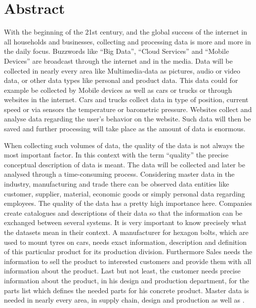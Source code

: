 \chapter*{Abstract}


With the beginning of the 21st century, and the global success of the internet in all households and businesses, collecting and processing data is more and more in the daily focus. Buzzwords like \enquote{Big Data}, \enquote{Cloud Services} and \enquote{Mobile Devices} are broadcast through the internet and in the media. Data will be collected in nearly every area like Multimedia-data as pictures, audio or video data, or other data types like personal and product data. This data could for example be collected by Mobile devices as well as cars or trucks or through websites in the internet. Cars and trucks collect data in type of position, current speed or via sensors the temperature or barometric pressure. Websites collect and analyse data regarding the user's behavior on the website. Such data will then be saved and further processing will take place as the amount of data is enormous. 

When collecting such volumes of data, the quality of the data is not always the most important factor. In this context with the term \enquote{quality} the precise conceptual description of data is meant. The data will be collected and later be analysed through a time-consuming process. 
Considering master data in the industry, manufacturing and trade there can be observed data entities like customer, supplier, material, economic goods or simply personal data regarding employees. The quality of the data has a pretty high importance here. Companies create catalogues and descriptions of their data so that the information can be exchanged between several systems. It is very important to know precisely what the datasets mean in their context. A manufacturer for hexagon bolts, which are used to mount tyres on cars, needs exact information, description and definition of this particular product for its production division. Furthermore Sales needs the information to sell the product to interested customers and provide them with all information about the product. Last but not least, the customer needs precise information about the product, in his design and production department, for the parts list which defines the needed parts for his concrete product. Master data is needed in nearly every area, in supply chain, design and production as well as . 

